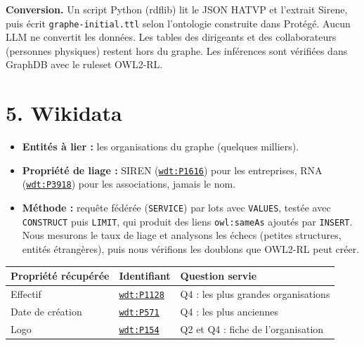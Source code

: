 \documentclass[11pt,a4paper]{article}
\newcommand{\wdprop}[1]{\href{https://www.wikidata.org/wiki/Property:#1}{\texttt{wdt:#1}}}
\begin{document}
\textbf{Conversion.} Un script Python (rdflib) lit le JSON HATVP et l'extrait Sirene, puis écrit \texttt{graphe-}\allowbreak\texttt{initial.ttl} selon l'ontologie construite dans Protégé. Aucun LLM ne convertit les données. Les tables des dirigeants et des collaborateurs (personnes physiques) restent hors du graphe. Les inférences sont vérifiées dans GraphDB avec le ruleset OWL2-RL.

\section*{5. Wikidata}

\begin{itemize}
  \item \textbf{Entités à lier :} les organisations du graphe (quelques milliers).
  \item \textbf{Propriété de liage :} SIREN (\wdprop{P1616}) pour les entreprises, RNA (\wdprop{P3918}) pour les associations, jamais le nom.
  \item \textbf{Méthode :} requête fédérée (\texttt{SERVICE}) par lots avec \texttt{VALUES}, testée avec \texttt{CONSTRUCT} puis \texttt{LIMIT}, qui produit des liens \texttt{owl:sameAs} ajoutés par \texttt{INSERT}. Nous mesurons le taux de liage et analysons les échecs (petites structures, entités étrangères), puis nous vérifions les doublons que OWL2-RL peut créer.
\end{itemize}

\medskip
{\small
\begin{tabularx}{\linewidth}{@{}l l Y@{}}
  \toprule
  \textbf{Propriété récupérée} & \textbf{Identifiant} & \textbf{Question servie}\\
  \midrule
  Effectif & \wdprop{P1128} & Q4 : les plus grandes organisations\\
  Date de création & \wdprop{P571} & Q4 : les plus anciennes\\
  Logo & \wdprop{P154} & Q2 et Q4 : fiche de l'organisation\\
  \bottomrule
\end{tabularx}}
\end{document}
